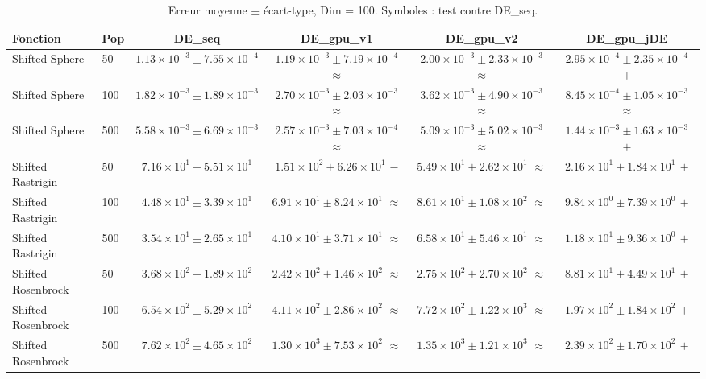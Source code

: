 \begin{table}[t]
\centering
\caption{Erreur moyenne $\pm$ écart-type, Dim = 100. Symboles : test contre DE\_seq.}
\label{tab:quality_d100}
\scriptsize
\begin{tabular}{llcccc}
\toprule
Fonction & Pop & DE\_seq & DE\_gpu\_v1 & DE\_gpu\_v2 & DE\_gpu\_jDE \\
\midrule
Shifted Sphere & 50 & $1.13\times10^{-3}\pm7.55\times10^{-4}$ & $1.19\times10^{-3}\pm7.19\times10^{-4}$ $\approx$ & $2.00\times10^{-3}\pm2.33\times10^{-3}$ $\approx$ & \textbf{$2.95\times10^{-4}\pm2.35\times10^{-4}$ $+$} \\
Shifted Sphere & 100 & $1.82\times10^{-3}\pm1.89\times10^{-3}$ & $2.70\times10^{-3}\pm2.03\times10^{-3}$ $\approx$ & $3.62\times10^{-3}\pm4.90\times10^{-3}$ $\approx$ & \textbf{$8.45\times10^{-4}\pm1.05\times10^{-3}$ $\approx$} \\
Shifted Sphere & 500 & $5.58\times10^{-3}\pm6.69\times10^{-3}$ & $2.57\times10^{-3}\pm7.03\times10^{-4}$ $\approx$ & $5.09\times10^{-3}\pm5.02\times10^{-3}$ $\approx$ & \textbf{$1.44\times10^{-3}\pm1.63\times10^{-3}$ $+$} \\
Shifted Rastrigin & 50 & $7.16\times10^{1}\pm5.51\times10^{1}$ & $1.51\times10^{2}\pm6.26\times10^{1}$ $-$ & $5.49\times10^{1}\pm2.62\times10^{1}$ $\approx$ & \textbf{$2.16\times10^{1}\pm1.84\times10^{1}$ $+$} \\
Shifted Rastrigin & 100 & $4.48\times10^{1}\pm3.39\times10^{1}$ & $6.91\times10^{1}\pm8.24\times10^{1}$ $\approx$ & $8.61\times10^{1}\pm1.08\times10^{2}$ $\approx$ & \textbf{$9.84\times10^{0}\pm7.39\times10^{0}$ $+$} \\
Shifted Rastrigin & 500 & $3.54\times10^{1}\pm2.65\times10^{1}$ & $4.10\times10^{1}\pm3.71\times10^{1}$ $\approx$ & $6.58\times10^{1}\pm5.46\times10^{1}$ $\approx$ & \textbf{$1.18\times10^{1}\pm9.36\times10^{0}$ $+$} \\
Shifted Rosenbrock & 50 & $3.68\times10^{2}\pm1.89\times10^{2}$ & $2.42\times10^{2}\pm1.46\times10^{2}$ $\approx$ & $2.75\times10^{2}\pm2.70\times10^{2}$ $\approx$ & \textbf{$8.81\times10^{1}\pm4.49\times10^{1}$ $+$} \\
Shifted Rosenbrock & 100 & $6.54\times10^{2}\pm5.29\times10^{2}$ & $4.11\times10^{2}\pm2.86\times10^{2}$ $\approx$ & $7.72\times10^{2}\pm1.22\times10^{3}$ $\approx$ & \textbf{$1.97\times10^{2}\pm1.84\times10^{2}$ $+$} \\
Shifted Rosenbrock & 500 & $7.62\times10^{2}\pm4.65\times10^{2}$ & $1.30\times10^{3}\pm7.53\times10^{2}$ $\approx$ & $1.35\times10^{3}\pm1.21\times10^{3}$ $\approx$ & \textbf{$2.39\times10^{2}\pm1.70\times10^{2}$ $+$} \\

\end{tabular}
\end{table}
